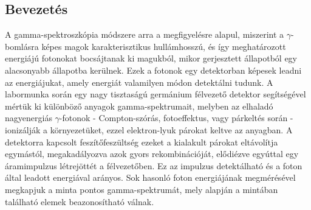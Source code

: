 \begin{multicols}{2}
\section{Bevezetés}
A gamma-spektroszkópia módszere arra a megfigyelésre alapul, miszerint a $\gamma$-bomlásra képes magok karakterisztikus hullámhosszú, és így meghatározott energiájú fotonokat bocsájtanak ki magukból, mikor gerjesztett állapotból egy alacsonyabb állapotba kerülnek. Ezek a fotonok egy detektorban képesek leadni az energiájukat, amely energiát valamilyen módon detektálni tudunk. \newline
A labormunka során egy nagy tisztaságú germánium félvezető detektor segítségével mértük ki különböző anyagok gamma-spektrumait, melyben az elhaladó nagyenergiás $\gamma$-fotonok - Compton-szórás, fotoeffektus, vagy párkeltés során - ionizálják a környezetüket, ezzel elektron-lyuk párokat keltve az anyagban. A detektorra kapcsolt feszítőfeszültség ezeket a kialakult párokat eltávolítja egymástól, megakadályozva azok gyors rekombinációját, elődiézve egyúttal egy áramimpulzus létrejöttét a félvezetőben. Ez az impulzus detektálható és a foton által leadott energiával arányos. Sok hasonló foton energiájának megmérésével megkapjuk a minta pontos gamma-spektrumát, mely alapján a mintában található elemek beazonosítható válnak.



\end{multicols}
